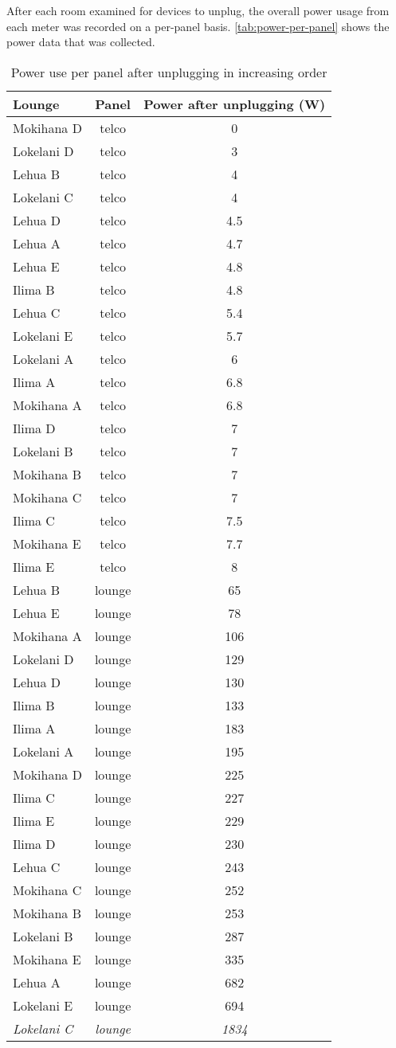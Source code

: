 \documentclass[11pt,draft]{article}
\begin{document}
After each room examined for devices to unplug, the overall power usage from each meter was recorded on a per-panel basis. \autoref{tab:power-per-panel} shows the power data that was collected.

\begin{table}[htbp]
	\centering
	\scriptsize
		\begin{tabular}{| l | c | c |}
			\hline
			Lounge & Panel & Power after unplugging (W) \tabularnewline \hline \hline
			Mokihana D & telco & 0 \tabularnewline \hline
			Lokelani D & telco & 3 \tabularnewline \hline
			Lehua B & telco & 4 \tabularnewline \hline
			Lokelani C & telco & 4 \tabularnewline \hline
			Lehua D & telco & 4.5 \tabularnewline \hline
			Lehua A & telco & 4.7 \tabularnewline \hline
			Lehua E & telco & 4.8 \tabularnewline \hline
			Ilima B & telco & 4.8 \tabularnewline \hline
			Lehua C & telco & 5.4 \tabularnewline \hline
			Lokelani E & telco & 5.7 \tabularnewline \hline
			Lokelani A & telco & 6 \tabularnewline \hline
			Ilima A & telco & 6.8 \tabularnewline \hline
			Mokihana A & telco & 6.8 \tabularnewline \hline
			Ilima D & telco & 7 \tabularnewline \hline
			Lokelani B & telco & 7 \tabularnewline \hline
			Mokihana B & telco & 7 \tabularnewline \hline
			Mokihana C & telco & 7 \tabularnewline \hline
			Ilima C & telco & 7.5 \tabularnewline \hline
			Mokihana E & telco &7.7 \tabularnewline \hline
			Ilima E & telco & 8 \tabularnewline \hline \hline
			Lehua B & lounge & 65 \tabularnewline \hline
			Lehua E & lounge & 78 \tabularnewline \hline
			Mokihana A & lounge & 106 \tabularnewline \hline
			Lokelani D & lounge & 129 \tabularnewline \hline
			Lehua D & lounge & 130 \tabularnewline \hline
			Ilima B & lounge & 133 \tabularnewline \hline \hline
			Ilima A & lounge & 183 \tabularnewline \hline
			Lokelani A & lounge & 195 \tabularnewline \hline
			Mokihana D & lounge & 225 \tabularnewline \hline
			Ilima C & lounge & 227 \tabularnewline \hline
			Ilima E & lounge & 229 \tabularnewline \hline
			Ilima D & lounge & 230 \tabularnewline \hline
			Lehua C & lounge & 243 \tabularnewline \hline
			Mokihana C & lounge & 252 \tabularnewline \hline
			Mokihana B & lounge & 253 \tabularnewline \hline
			Lokelani B & lounge & 287 \tabularnewline \hline
			Mokihana E & lounge & 335 \tabularnewline \hline
			Lehua A & lounge & 682 \tabularnewline \hline
			Lokelani E & lounge & 694 \tabularnewline \hline \hline
			\emph{Lokelani C} & \emph{lounge} & \emph{1834} \tabularnewline \hline
		\end{tabular}
	\caption{Power use per panel after unplugging in increasing order}
\label{tab:power-per-panel}
\end{table}
\end{document}
